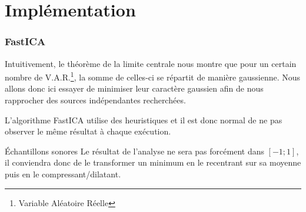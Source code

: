 \documentclass[compress]{beamer}
\begin{document}
\section{Implémentation}
\begin{frame}
	\frametitle{FastICA}
	Intuitivement, le théorème de la limite centrale nous montre que pour un
	certain nombre de V.A.R.\footnote{Variable Aléatoire Réelle},
	la somme de celles-ci se répartit de manière
	gaussienne. Nous allons donc ici essayer de minimiser leur caractère
	gaussien afin de nous rapprocher des sources indépendantes recherchées.
	\pause
	\vfill

	L'algorithme FastICA utilise des heuristiques et il est donc normal
	de ne pas observer le même résultat à chaque exécution.
	\pause
	\vfill

	\begin{block}{Échantillons sonores}
	Le résultat de l'analyse ne sera pas forcément dans $[-1;1]$,
	il conviendra donc de le transformer un minimum en le recentrant
	sur sa moyenne puis en le compressant/dilatant.
	\end{block}

\end{frame}
\end{document}
